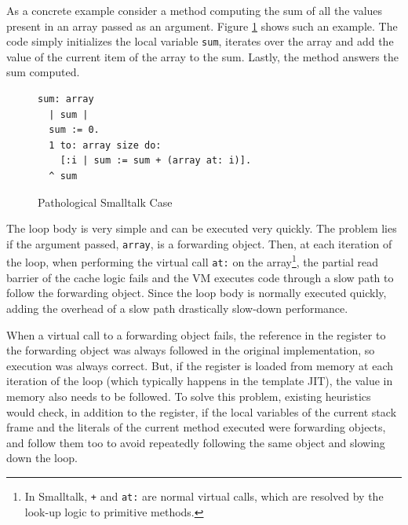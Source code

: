 \documentclass[sigplan,10pt,review,anonymous]{acmart}\settopmatter{printfolios=true,printccs=false,printacmref=false}
\begin{document}

As a concrete example consider a method computing the sum of all the values present in an array passed as an argument. Figure \ref{fig:code} shows such an example. The code simply initializes the local variable \texttt{sum}, iterates over the array and add the value of the current item of the array to the sum. Lastly, the method answers the sum computed. 

\begin{figure}[bth]
		\vspace{-0.1cm}
\begin{verbatim}
sum: array
  | sum |
  sum := 0.
  1 to: array size do: 
    [:i | sum := sum + (array at: i)].
  ^ sum
\end{verbatim}
		\vspace{-0.3cm}
		\caption{Pathological Smalltalk Case\vspace{-0.3cm}}
		\label{fig:code}
 \end{figure}

The loop body is very simple and can be executed very quickly. The problem lies if the argument passed, \texttt{array}, is a forwarding object. Then, at each iteration of the loop, when performing the virtual call \texttt{at:} on the array\footnote{In Smalltalk, \texttt{+} and \texttt{at:} are normal virtual calls, which are resolved by the look-up logic to primitive methods.}, the partial read barrier of the cache logic fails and the VM executes code through a slow path to follow the forwarding object. Since the loop body is normally executed quickly, adding the overhead of a slow path drastically slow-down performance. 

When a virtual call to a forwarding object fails, the reference in the register to the forwarding object was always followed in the original implementation, so execution was always correct. But, if the register is loaded from memory at each iteration of the loop (which typically happens in the template JIT), the value in memory also needs to be followed. %
To solve this problem, existing heuristics would check, in addition to the register, if the local variables of the current stack frame and the literals of the current method executed were forwarding objects, and follow them too to avoid repeatedly following the same object and slowing down the loop.
 
\end{document}

